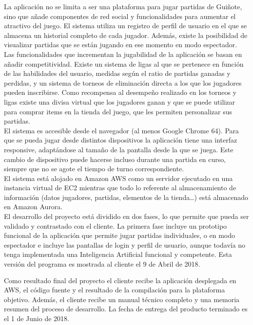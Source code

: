 \documentclass[]{article}
\begin{document}
La aplicación no se limita a ser una plataforma para jugar partidas de Guiñote, sino que añade componentes de red social y funcionalidades para aumentar el atractivo del juego. El sistema utiliza un registro de perfil de usuario en el que se almacena un historial completo de cada jugador. Además, existe la posibilidad de visualizar partidas que se están jugando en ese momento en modo espectador. Las funcionalidades que incrementan la jugabilidad de la aplicación se basan en añadir competitividad. Existe un sistema de ligas al que se pertenece en función de las habilidades del usuario, medidas según el ratio de partidas ganadas y perdidas, y un sistema de torneos de eliminación directa a los que los jugadores pueden inscribirse. Como recompensa al desempeño realizado en los torneos y ligas existe una divisa virtual que los jugadores ganan y que se puede utilizar para comprar items en la tienda del juego, que les permiten personalizar sus partidas.\\

El sistema es accesible desde el navegador (al menos Google Chrome 64). Para que se pueda jugar desde distintos dispositivos la aplicación tiene una interfaz responsive, adaptándose al tamaño de la pantalla desde la que se juega. Este cambio de dispositivo puede hacerse incluso durante una partida en curso, siempre que no se agote el tiempo de turno correspondiente. \\

El sistema está alojado en Amazon AWS como un servidor ejecutado en una instancia virtual de EC2 mientras que todo lo referente al almacenamiento de información (datos jugadores, partidas, elementos de la tienda…) está almacenado en Amazon Aurora. \\

El desarrollo del proyecto está dividido en dos fases, lo que permite que pueda ser validado y contrastado con el cliente. La primera fase incluye un prototipo funcional de la aplicación que permite jugar partidas individuales, o en modo espectador e incluye las pantallas de login y perfil de usuario, aunque todavía no tenga implementada una Inteligencia Artificial funcional y competente. Esta versión del programa es mostrada al cliente el 9 de Abril de 2018.

Como resultado final del proyecto el cliente recibe la aplicación desplegada en AWS, el código fuente y el resultado de la compilación para la plataforma objetivo. Además, el cliente recibe un manual técnico completo y una memoria resumen del proceso de desarrollo. La fecha de entrega del producto terminado es el 1 de Junio de 2018.\\
\end{document}
